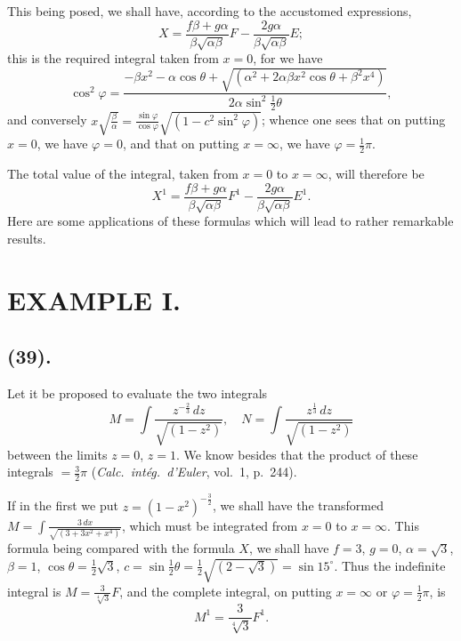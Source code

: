 \documentclass{article}
\begin{document}

This being posed, we shall have, according to the accustomed expressions,
\[ X=\frac{f\beta+g\alpha}{\beta\sqrt{\alpha\beta}}F-\frac{2g\alpha}{\beta\sqrt{\alpha\beta}}E; \]
this is the required integral taken from $x=0$, for we have
\[ \cos^{2}\varphi=\frac{-\beta x^{2}-\alpha\cos\theta+\sqrt{(\alpha^{2}+2\alpha\beta x^{2}\cos\theta+\beta^{2}x^{4})}}{2\alpha\sin^{2}\tfrac{1}{2}\theta}, \]
and conversely $x\sqrt{\frac{\beta}{\alpha}}=\frac{\sin\varphi}{\cos\varphi}\sqrt{(1-c^{2}\sin^{2}\varphi)}$; whence one sees that on putting $x=0$, we have $\varphi=0$, and that on putting $x=\infty$, we have $\varphi=\frac{1}{2}\pi$.

The total value of the integral, taken from $x=0$ to $x=\infty$, will therefore be
\[ X^{1}=\frac{f\beta+g\alpha}{\beta\sqrt{\alpha\beta}}F^{1}-\frac{2g\alpha}{\beta\sqrt{\alpha\beta}}E^{1}. \]
Here are some applications of these formulas which will lead to rather remarkable results.

\section*{EXAMPLE I.}

\subsection*{(39).}

Let it be proposed to evaluate the two integrals
\[ M=\int\frac{z^{-\frac{2}{3}}\,dz}{\sqrt{(1-z^{2})}},\quad N=\int\frac{z^{\frac{1}{3}}\,dz}{\sqrt{(1-z^{2})}} \]
between the limits $z=0$, $z=1$. We know besides that the product of these integrals $=\frac{3}{2}\pi$ (\emph{Calc.\ intég.\ d'Euler}, vol.~1, p.~244).

If in the first we put $z=(1-x^{2})^{-\frac{3}{2}}$, we shall have the transformed $M=\displaystyle\int\frac{3\,dx}{\sqrt{(3+3x^{2}+x^{4})}}$, which must be integrated from $x=0$ to $x=\infty$. This formula being compared with the formula $X$, we shall have $f=3$, $g=0$, $\alpha=\sqrt{3}$, $\beta=1$, $\cos\theta=\frac{1}{2}\sqrt{3}$, $c=\sin\frac{1}{2}\theta=\frac{1}{2}\sqrt{(2-\sqrt{3})}=\sin 15^{\circ}$. Thus the indefinite integral is $M=\frac{3}{\sqrt[4]{3}}F$, and the complete integral, on putting $x=\infty$ or $\varphi=\frac{1}{2}\pi$, is
\[ M^{1}=\frac{3}{\sqrt[4]{3}}F^{1}. \]
\end{document}

